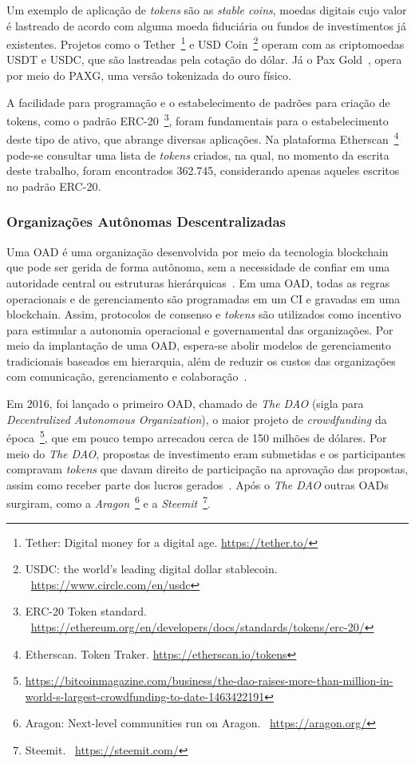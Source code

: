 Um exemplo de aplicação de \textit{tokens} são as \textit{stable coins}, moedas digitais cujo valor é lastreado de acordo com alguma moeda fiduciária ou fundos de investimentos já existentes. Projetos como o Tether~\footnote{Tether: Digital money for a digital age. \url{https://tether.to/}} e USD Coin~\footnote{USDC: the world's leading digital dollar stablecoin. ~\url{https://www.circle.com/en/usdc}} operam com as criptomoedas USDT e USDC, que são lastreadas pela cotação do dólar. Já o Pax Gold~\cite{paxgold-whitepaper}, opera por meio do  PAXG, uma versão tokenizada do ouro físico.

A facilidade para programação e o estabelecimento de padrões para criação de tokens, como o padrão ERC-20~\footnote{ERC-20 Token standard. ~\url{https://ethereum.org/en/developers/docs/standards/tokens/erc-20/}}, foram fundamentais para o estabelecimento deste tipo de ativo, que abrange diversas aplicações. Na plataforma Etherscan~\footnote{Etherscan. Token Traker. \url{https://etherscan.io/tokens}} pode-se consultar uma lista de \textit{tokens} criados, na qual, no momento da escrita deste trabalho, foram encontrados 362.745, considerando apenas aqueles escritos no padrão ERC-20.

\subsubsection*{\textbf{Organizações Autônomas Descentralizadas}} 

Uma OAD é uma organização desenvolvida por meio da tecnologia blockchain que pode ser gerida de forma autônoma, sem a necessidade de confiar em uma autoridade central ou estruturas hierárquicas~\cite{wang2019DAO-survey}. Em uma OAD, todas as regras operacionais e de gerenciamento são programadas em um CI e gravadas em uma blockchain. Assim, protocolos de consenso e \textit{tokens} são utilizados como incentivo para estimular a autonomia operacional e governamental das organizações. Por meio da implantação de uma OAD, espera-se abolir modelos de gerenciamento tradicionais baseados em hierarquia, além de reduzir os custos das organizações com comunicação, gerenciamento e colaboração~\cite{wang2019DAO-survey}.

Em 2016, foi lançado o primeiro OAD, chamado de \textit{The DAO} (sigla para \textit{Decentralized Autonomous Organization}), o maior projeto de \textit{crowdfunding} da época~\footnote{\url{https://bitcoinmagazine.com/business/the-dao-raises-more-than-million-in-world-s-largest-crowdfunding-to-date-1463422191}}, que em pouco tempo arrecadou cerca de 150 milhões de dólares. Por meio do \textit{The DAO}, propostas de investimento eram submetidas e os participantes compravam \textit{tokens} que davam direito de participação na aprovação das propostas, assim como receber parte dos lucros gerados~\cite{wang2019DAO-survey}. Após o \textit{The DAO} outras OADs surgiram, como a \textit{Aragon}~\footnote{Aragon: Next-level communities run on Aragon. ~\url{https://aragon.org/}} e a \textit{Steemit}~\footnote{Steemit. ~\url{https://steemit.com/}}. 

